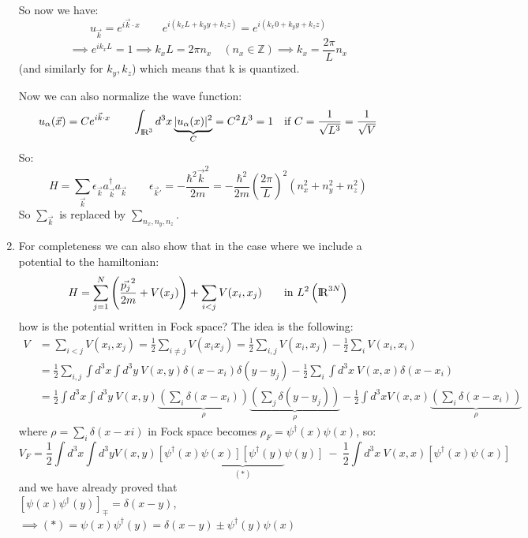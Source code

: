 \begin{enumerate}[label=\roman*)]
    So now we have: 
    $$u_{\vec k} = e^{i\vec k\cdot x} \qquad  e^{i(k_xL + k_yy + k_zz)} = e^{i(k_x0 + k_yy + k_zz)}$$
    $$ \implies e^{ik_xL} = 1 \implies k_xL = 2\pi n_x \quad (n_x \in \mathbb Z) \implies k_x = \frac{2\pi}L n_x$$
    (and similarly for $k_y, k_z$) which means that k is quantized.

    Now we can also normalize the wave function:
    $$ u_\alpha(\vec x) = C e^{i\vec k\cdot x} \qquad \int _{{\rm I\!R}^3}d^3x\underbrace{|u_\alpha(x)|^2}_{C} = C^2L^3 = 1 \quad \text{if } C = \frac1{\sqrt{L^3}} = \frac 1{\sqrt{V}}$$
    So:
    $$ H = \sum_{\vec k} \epsilon_{\vec k} a_{\vec k}^\dag a_{\vec k} \qquad \epsilon_{\vec k'} = -\frac{\hbar^2 {\vec k}^2}{2m} = -\frac {\hbar^2}{2m} \left(\frac{2\pi}L\right)^2\left(n_x^2 + n_y^2 + n_z^2\right) $$
    So $\sum_{\vec k}$ is replaced by $\sum_{n_x,n_y,n_z}$.

    \item
    For completeness we can also show that in the case where we include a potential to the hamiltonian:
    $$ H = \sum_{j=1}^N \left(\frac{\vec{p_j}^2}{2m} + V(x_j)\right) + \sum_{i<j} V(x_i, x_j) \qquad \text{in } L^2\left({\rm I\!R}^{3N}\right)$$
    how is the potential written in Fock space? The idea is the following:
    \begin{align*}
         V &= \sum_{i<j} V(x_i,x_j) = \frac 12\sum_{i\ne j}V(x_i x_j) = \frac 12\sum_{i,j} V(x_i, x_j) - \frac 12 \sum_i V(x_i, x_i) \\
         &= \frac 12 \sum_{i,j}\int d^3x \int d^3y \ V(x,y) \delta (x-x_i) \delta(y-y_j) - \frac 12 \sum_i \int d^3x \ V(x,x) \delta (x-x_i)\\
         &= \frac 12 \int d^3x \int d^3y \ V(x,y) \underbrace{\left(\sum_i \delta (x-x_i)\right)}_\rho \underbrace{\left(\sum_j \delta (y-y_j)\right)}_\rho - \frac12 \int d^3 x V(x,x) \underbrace{\left(\sum_i \delta (x-x_i)\right)}_\rho
    \end{align*}
    where $\rho = \sum_i\delta(x-xi)$ in Fock space becomes $\rho_F = \psi^\dag(x) \psi(x)$, so:
    $$ V_F = \frac12 \int d^3 x  \int d^3 y V(x,y) \left[ \psi^\dag(x) \right.\underbrace{\left.\psi(x)\right]\left[\psi^\dag(y)\right.}_{(*)}\left. \psi(y)\right] \ -\ \frac 12 \int d^3x\ V(x,x) \left[\psi^\dag(x) \psi(x)\right]    $$
    and we have already proved that\\  $\left[\psi(x) \psi^\dag(y)\right]_\mp = \delta(x-y)$, \\
    $\implies (*) = \psi(x) \psi^\dag(y) = \delta(x-y) \pm \psi^\dag(y)\psi(x)$
    

\end{enumerate}
